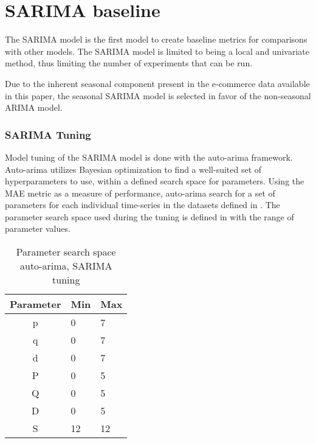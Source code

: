 
\section{SARIMA baseline}
\label{section:Method:SARIMA}

The SARIMA model is the first model to create baseline metrics for comparisons with other models.
The SARIMA model is limited to being a local and univariate method,
thus limiting the number of experiments that can be run.

Due to the inherent seasonal component present in the e-commerce data available in this paper,
the seasonal SARIMA model is selected in favor of the non-seasonal ARIMA model.

\subsubsection{SARIMA Tuning}
Model tuning of the SARIMA model is done with the auto-arima framework.
Auto-arima utilizes Bayesian optimization to find a well-suited set of hyperparameters to use,
within a defined search space for parameters.
Using the MAE metric as a measure of performance, auto-arima search for a set of parameters for each individual time-series
in the datasets defined in .
The parameter search space used during the tuning is defined in  with the range of parameter values.

\begin{table}[h]
  \centering
  \caption{Parameter search space auto-arima, SARIMA tuning}
  \label{table:method:arima-tuning}
  \begin{tabular}{|c|l|l|}\hline
    Parameter & Min & Max \\ \hline
    p         & 0   & 7   \\ \hline
    q         & 0   & 7   \\ \hline
    d         & 0   & 7   \\ \hline
    P         & 0   & 5   \\ \hline
    Q         & 0   & 5   \\ \hline
    D         & 0   & 5   \\ \hline
    S         & 12   & 12   \\ \hline
  \end{tabular}
\end{table}









